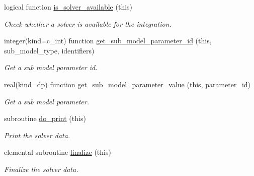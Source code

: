 \begin{DoxyCompactItemize}
logical function \mbox{\hyperlink{namespacepmc__phlex__solver__data_a74602731d9d435e9a16380c93bbc2073}{is\+\_\+solver\+\_\+available}} (this)
\begin{DoxyCompactList}\small\item\em Check whether a solver is available for the integration. \end{DoxyCompactList}\item 
integer(kind=c\+\_\+int) function \mbox{\hyperlink{namespacepmc__phlex__solver__data_a9af2b98e55136169b2ad7a82dbb14a0e}{get\+\_\+sub\+\_\+model\+\_\+parameter\+\_\+id}} (this, sub\+\_\+model\+\_\+type, identifiers)
\begin{DoxyCompactList}\small\item\em Get a sub model parameter id. \end{DoxyCompactList}\item 
real(kind=dp) function \mbox{\hyperlink{namespacepmc__phlex__solver__data_a01c236fc4f27615b63e278dee75bebf2}{get\+\_\+sub\+\_\+model\+\_\+parameter\+\_\+value}} (this, parameter\+\_\+id)
\begin{DoxyCompactList}\small\item\em Get a sub model parameter. \end{DoxyCompactList}\item 
subroutine \mbox{\hyperlink{namespacepmc__phlex__solver__data_a471de3023e1bb6f999905cc0870d37f5}{do\+\_\+print}} (this)
\begin{DoxyCompactList}\small\item\em Print the solver data. \end{DoxyCompactList}\item 
elemental subroutine \mbox{\hyperlink{namespacepmc__phlex__solver__data_afd20da14fccfdeabce1c2d4ffed4aec2}{finalize}} (this)
\begin{DoxyCompactList}\small\item\em Finalize the solver data. \end{DoxyCompactList}\end{DoxyCompactItemize}
